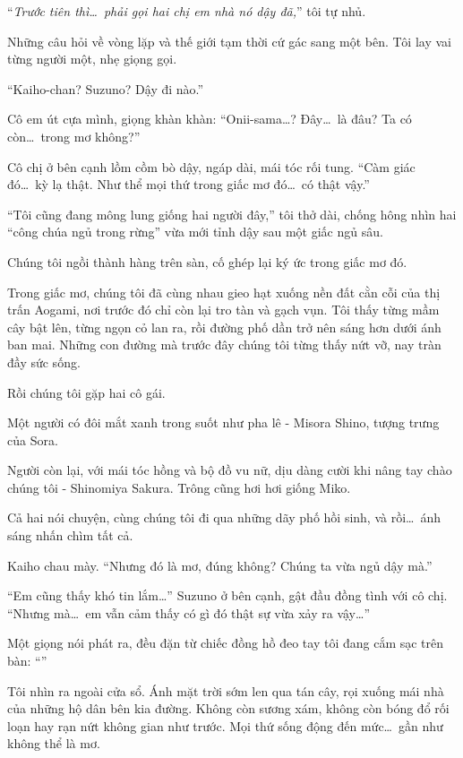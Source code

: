 \documentclass[../main.tex]{subfiles}
\begin{document}
``\textit{Trước tiên thì\dots\ phải gọi hai chị em nhà nó dậy đã,}'' tôi tự nhủ.

Những câu hỏi về vòng lặp và thế giới tạm thời cứ gác sang một bên. Tôi lay vai từng người một, nhẹ giọng gọi.

``Kaiho-chan? Suzuno? Dậy đi nào.''

Cô em út cựa mình, giọng khàn khàn: ``Onii-sama\dots? Đây\dots\ là đâu? Ta có còn\dots\ trong mơ không?''

Cô chị ở bên cạnh lồm cồm bò dậy, ngáp dài, mái tóc rối tung. ``Càm giác đó\dots\ kỳ lạ thật. Như thể mọi thứ trong giấc mơ đó\dots\ có thật vậy.''

``Tôi cũng đang mông lung giống hai người đây,'' tôi thở dài, chống hông nhìn hai ``công chúa ngủ trong rừng'' vừa mới tỉnh dậy sau một giấc ngủ sâu.

Chúng tôi ngồi thành hàng trên sàn, cố ghép lại ký ức trong giấc mơ đó.

Trong giấc mơ, chúng tôi đã cùng nhau gieo hạt xuống nền đất cằn cỗi của thị trấn Aogami, nơi trước đó chỉ còn lại tro tàn và gạch vụn. Tôi thấy từng mầm cây bật lên, từng ngọn cỏ lan ra, rồi đường phố dần trở nên sáng hơn dưới ánh ban mai. Những con đường mà trước đây chúng tôi từng thấy nứt vỡ, nay tràn đầy sức sống.

Rồi chúng tôi gặp hai cô gái.

Một người có đôi mắt xanh trong suốt như pha lê - Misora Shino, tượng trưng của Sora.

Người còn lại, với mái tóc hồng và bộ đồ vu nữ, dịu dàng cười khi nâng tay chào chúng tôi - Shinomiya Sakura. Trông cũng hơi hơi giống Miko.

Cả hai nói chuyện, cùng chúng tôi đi qua những dãy phố hồi sinh, và rồi\dots\ ánh sáng nhấn chìm tất cả.

Kaiho chau mày. ``Nhưng đó là mơ, đúng không? Chúng ta vừa ngủ dậy mà.''

``Em cũng thấy khó tin lắm\dots'' Suzuno ở bên cạnh, gật đầu đồng tình với cô chị. ``Nhưng mà\dots\ em vẫn cảm thấy có gì đó thật sự vừa xảy ra vậy\dots''

Một giọng nói phát ra, đều đặn từ chiếc đồng hồ đeo tay tôi đang cắm sạc trên bàn: ``''

Tôi nhìn ra ngoài cửa sổ. Ánh mặt trời sớm len qua tán cây, rọi xuống mái nhà của những hộ dân bên kia đường. Không còn sương xám, không còn bóng đổ rối loạn hay rạn nứt không gian như trước. Mọi thứ sống động đến mức\dots\ gần như không thể là mơ.
\end{document}
